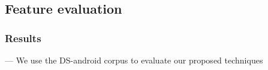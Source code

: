 \subsection{Feature evaluation}



\subsubsection{Results}



--- We use the \acs{DS-android} corpus to evaluate our proposed techniques  \vspace{3mm}













